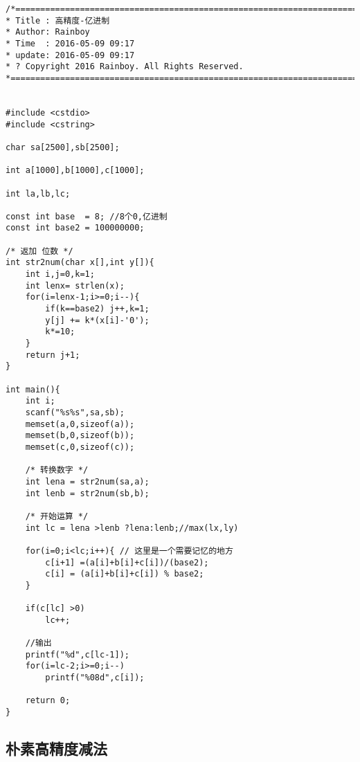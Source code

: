 \begin{lstlisting}
/*============================================================================
* Title : 高精度-亿进制
* Author: Rainboy
* Time  : 2016-05-09 09:17
* update: 2016-05-09 09:17
* ? Copyright 2016 Rainboy. All Rights Reserved.
*=============================================================================*/


#include <cstdio>
#include <cstring>

char sa[2500],sb[2500];

int a[1000],b[1000],c[1000];

int la,lb,lc;

const int base  = 8; //8个0,亿进制
const int base2 = 100000000;

/* 返加 位数 */
int str2num(char x[],int y[]){
    int i,j=0,k=1;
    int lenx= strlen(x);
    for(i=lenx-1;i>=0;i--){
        if(k==base2) j++,k=1;
        y[j] += k*(x[i]-'0');
        k*=10;
    }
    return j+1;
}

int main(){
    int i;
    scanf("%s%s",sa,sb);
    memset(a,0,sizeof(a));
    memset(b,0,sizeof(b));
    memset(c,0,sizeof(c));

    /* 转换数字 */
    int lena = str2num(sa,a);
    int lenb = str2num(sb,b);

    /* 开始运算 */
    int lc = lena >lenb ?lena:lenb;//max(lx,ly)

    for(i=0;i<lc;i++){ // 这里是一个需要记忆的地方
        c[i+1] =(a[i]+b[i]+c[i])/(base2);
        c[i] = (a[i]+b[i]+c[i]) % base2;
    }

    if(c[lc] >0)
        lc++;

    //输出
    printf("%d",c[lc-1]);
    for(i=lc-2;i>=0;i--)
        printf("%08d",c[i]);

    return 0;
}
\end{lstlisting}


\subsection{朴素高精度减法}

